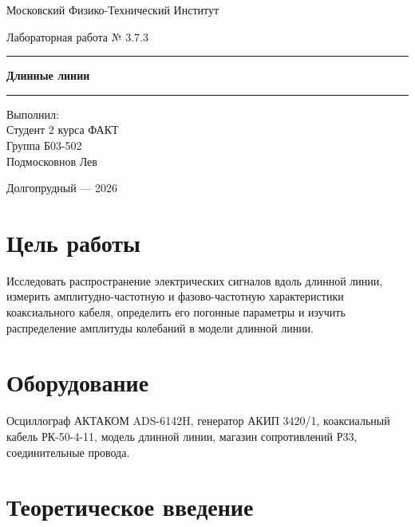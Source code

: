 \documentclass[a4paper,14pt]{extarticle}
\begin{document}
\begin{titlepage}
    \centering
    {\large Московский Физико-Технический Институт\par}

    \vspace{4cm}

    {\Large Лабораторная работа № 3.7.3\par}
    \vspace{0.7cm}
    \rule{\textwidth}{0.5pt}\par
    \vspace{0.35cm}
    {\LARGE\bfseries Длинные линии\par}
    \vspace{0.35cm}
    \rule{\textwidth}{0.5pt}\par

    \vfill

    \vspace{6.1cm}
\hfill
\begin{minipage}{0.42\textwidth}
  \raggedright
  Выполнил:\\
  Студент 2 курса ФАКТ\\
  Группа Б03-502\\
  Подмосковнов Лев
\end{minipage}

    \vfill
    {Долгопрудный --- 2026\par}
\end{titlepage}

\section{Цель работы}
Исследовать распространение электрических сигналов вдоль длинной линии,
измерить амплитудно-частотную и фазово-частотную характеристики
коаксиального кабеля, определить его погонные параметры и изучить
распределение амплитуды колебаний в модели длинной линии.

\section{Оборудование}
Осциллограф АКТАКОМ ADS-6142H, генератор АКИП 3420/1, коаксиальный
кабель РК-50-4-11, модель длинной линии, магазин сопротивлений Р33,
соединительные провода.

\section{Теоретическое введение}
\end{document}
